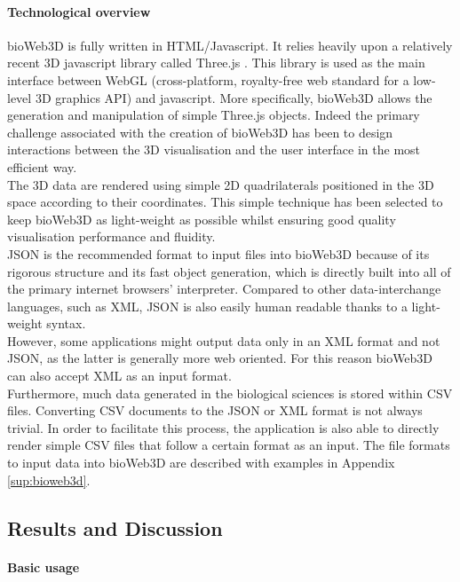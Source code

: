 		\paragraph{Technological overview}
bioWeb3D is fully written in HTML/Javascript. It relies heavily upon a relatively recent 3D javascript library called Three.js \cite{three}. This library is used as the main interface between WebGL (cross-platform, royalty-free web standard for a low-level 3D graphics API) \cite{webgl} and javascript. More specifically, bioWeb3D allows the generation and manipulation of simple Three.js objects. Indeed the primary challenge associated with the creation of bioWeb3D has been to design interactions between the 3D visualisation and the user interface in the most efficient way.\\
The 3D data are rendered using simple 2D quadrilaterals positioned in the 3D space according to their coordinates. This simple technique has been selected to keep bioWeb3D as light-weight as possible whilst ensuring good quality visualisation performance and fluidity.\\


JSON is the recommended format to input files into bioWeb3D because of its rigorous structure and its fast object generation, which is directly built into all of the primary internet browsers' interpreter. Compared to other data-interchange languages, such as XML, JSON is also easily human readable thanks to a light-weight syntax.\\
However, some applications might output data only in an XML format and not JSON, as the latter is generally more web oriented. For this reason bioWeb3D can also accept XML as an input format.\\
Furthermore, much data generated in the biological sciences is stored within CSV files. Converting CSV documents to the JSON or XML format is not always trivial. In order to facilitate this process, the application is also able to directly render simple CSV files that follow a certain format as an input. The file formats to input data into bioWeb3D are described with examples in Appendix \ref{sup:bioweb3d}.

	\subsection{Results and Discussion}


		\paragraph{Basic usage}
	
